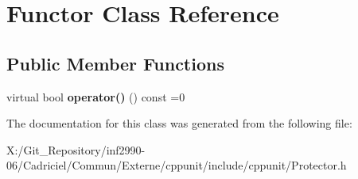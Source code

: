 \hypertarget{class_functor}{\section{Functor Class Reference}
\label{class_functor}
}
\subsection*{Public Member Functions}
\begin{DoxyCompactItemize}
\item 
\hypertarget{class_functor_a075ab7f3b1e7ace202e650670556acbd}{virtual bool {\bfseries operator()} () const =0}\label{class_functor_a075ab7f3b1e7ace202e650670556acbd}

\end{DoxyCompactItemize}


The documentation for this class was generated from the following file\-:\begin{DoxyCompactItemize}
\item 
X\-:/\-Git\-\_\-\-Repository/inf2990-\/06/\-Cadriciel/\-Commun/\-Externe/cppunit/include/cppunit/Protector.\-h\end{DoxyCompactItemize}
